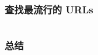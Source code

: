 \documentclass[./main.tex]{subfiles}
\begin{document}
%

\begin{lstlisting}[language=Haskell]

\end{lstlisting}

\subsubsection*{查找最流行的 URLs}

%

\begin{lstlisting}[language=Haskell]

\end{lstlisting}

\subsubsection*{总结}

%
\end{document}
